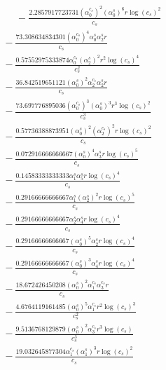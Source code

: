 \documentclass[10pt]{article}
\begin{document}
\begin{align*}
\phantom{R_{3,9}} &\phantom{={}}{}  - \frac{2.2857917723731 \left(\alpha_{0}^{c_s}\right)^{2} \left(\alpha_{0}^s\right)^{6} r \log{\left(c_{s} \right)}^{2}}{c_{s}} \\
&{}  - \frac{73.308634834301 \left(\alpha_{0}^{c_s}\right)^{4} \alpha_{0}^s \alpha_{2}^s r}{c_{s}} \\
&{}  - \frac{0.57552975333874 \alpha_{0}^{c_s} \left(\alpha_{2}^s\right)^{2} r^{2} \log{\left(c_{s} \right)}^{4}}{c_{s}^{2}} \\
&{}  - \frac{36.842519651121 \left(\alpha_{0}^s\right)^{2} \alpha_{2}^{c_s} \alpha_{2}^s r}{c_{s}} \\
&{}  - \frac{73.697776895036 \left(\alpha_{0}^{c_s}\right)^{3} \left(\alpha_{0}^s\right)^{3} r^{3} \log{\left(c_{s} \right)}^{2}}{c_{s}^{3}} \\
&{}  - \frac{0.57736388873951 \left(\alpha_{0}^s\right)^{2} \left(\alpha_{2}^{c_s}\right)^{2} r \log{\left(c_{s} \right)}^{2}}{c_{s}} \\
&{}  - \frac{0.072916666666667 \left(\alpha_{0}^s\right)^{4} \alpha_{3}^s r \log{\left(c_{s} \right)}^{5}}{c_{s}} \\
&{}  - \frac{0.14583333333333 \alpha_{1}^s \alpha_{5}^s r \log{\left(c_{s} \right)}^{4}}{c_{s}} \\
&{}  - \frac{0.29166666666667 \alpha_{1}^s \left(\alpha_{2}^s\right)^{2} r \log{\left(c_{s} \right)}^{5}}{c_{s}} \\
&{}  - \frac{0.29166666666667 \alpha_{2}^s \alpha_{4}^s r \log{\left(c_{s} \right)}^{4}}{c_{s}} \\
&{}  - \frac{0.29166666666667 \left(\alpha_{0}^s\right)^{5} \alpha_{2}^s r \log{\left(c_{s} \right)}^{4}}{c_{s}} \\
&{}  - \frac{0.29166666666667 \left(\alpha_{0}^s\right)^{3} \alpha_{4}^s r \log{\left(c_{s} \right)}^{4}}{c_{s}} \\
&{}  - \frac{18.672426450208 \left(\alpha_{0}^s\right)^{2} \alpha_{1}^{c_s} \alpha_{3}^{c_s} r}{c_{s}} \\
&{}  - \frac{4.6764119161485 \left(\alpha_{0}^s\right)^{5} \alpha_{1}^{c_s} r^{2} \log{\left(c_{s} \right)}^{3}}{c_{s}^{2}} \\
&{}  - \frac{9.5136768129879 \left(\alpha_{0}^s\right)^{2} \alpha_{3}^{c_s} r^{3} \log{\left(c_{s} \right)}}{c_{s}^{3}} \\
&{}  - \frac{19.032645877304 \alpha_{1}^{c_s} \left(\alpha_{1}^s\right)^{3} r \log{\left(c_{s} \right)}^{2}}{c_{s}} \\

\end{align*}
\end{document}
